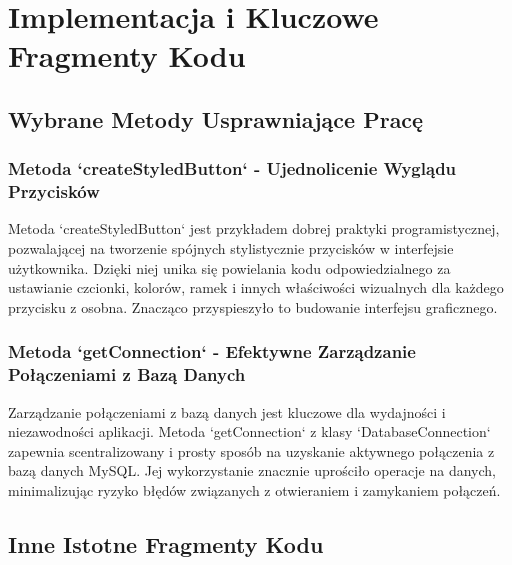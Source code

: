\chapter{Implementacja i Kluczowe Fragmenty Kodu}
\section{Wybrane Metody Usprawniające Pracę}

\begin{minipage}{\linewidth}
\subsection{Metoda `createStyledButton` - Ujednolicenie Wyglądu Przycisków}
Metoda `createStyledButton` jest przykładem dobrej praktyki programistycznej, pozwalającej na tworzenie spójnych stylistycznie przycisków w interfejsie użytkownika. Dzięki niej unika się powielania kodu odpowiedzialnego za ustawianie czcionki, kolorów, ramek i innych właściwości wizualnych dla każdego przycisku z osobna. Znacząco przyspieszyło to budowanie interfejsu graficznego. 


\end{minipage}

\vspace{1cm}

\begin{minipage}{\linewidth}
\subsection{Metoda `getConnection` - Efektywne Zarządzanie Połączeniami z Bazą Danych}
Zarządzanie połączeniami z bazą danych jest kluczowe dla wydajności i niezawodności aplikacji.  Metoda `getConnection` z klasy `DatabaseConnection` zapewnia scentralizowany i prosty sposób na uzyskanie aktywnego połączenia z bazą danych MySQL.  Jej wykorzystanie znacznie uprościło operacje na danych, minimalizując ryzyko błędów związanych z otwieraniem i zamykaniem połączeń. 


\end{minipage}

\section{Inne Istotne Fragmenty Kodu}


